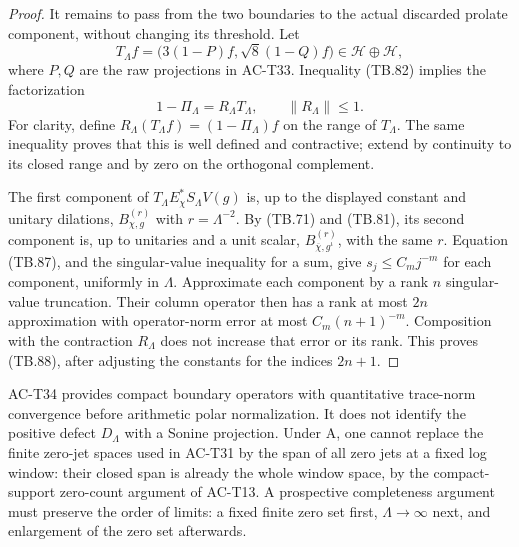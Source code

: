 \begin{proof}
It remains to pass from the two boundaries to the actual
discarded prolate component, without changing its threshold.
Let
\[
 T_\Lambda f=
        \bigl(3(1-P)f,\sqrt8(1-Q)f\bigr)
                      \in\mathcal H\oplus\mathcal H,
 \]
where \(P,Q\) are the raw projections in AC-T33.
Inequality (TB.82) implies the factorization
\[
               1-\Pi_\Lambda=R_\Lambda T_\Lambda,
                    \qquad \|R_\Lambda\|\leq1.
 \tag{TB.95}
\]
For clarity, define
\(R_\Lambda(T_\Lambda f)=(1-\Pi_\Lambda)f\) on the
range of \(T_\Lambda\).
The same inequality proves that this is well defined and
contractive; extend by continuity to its closed range and
by zero on the orthogonal complement.

The first component of
\(T_\Lambda E_\chi^*S_\Lambda V(g)\) is, up to the
displayed constant and unitary dilations, \(B_{\chi,g}^{(r)}\)
with \(r=\Lambda^{-2}\).
By (TB.71) and (TB.81), its second component is, up to
unitaries and a unit scalar,
\(B_{\overline\chi,g^\iota}^{(r)}\), with the same \(r\).
Equation (TB.87), and the singular-value inequality for a
sum, give \(s_j\leq C_mj^{-m}\) for each component,
uniformly in \(\Lambda\).
Approximate each component by a rank \(n\) singular-value
truncation.  Their column operator then has a rank at most
\(2n\) approximation with operator-norm error at most
\(C_m(n+1)^{-m}\).
Composition with the contraction \(R_\Lambda\) does not
increase that error or its rank.
This proves (TB.88), after adjusting the constants for
the indices \(2n+1\).
\end{proof}

\begin{remark}
AC-T34 provides compact boundary operators with quantitative
trace-norm convergence before arithmetic polar normalization.
It does not identify the positive defect \(D_\Lambda\)
with a Sonine projection.
Under A, one cannot replace the finite zero-jet spaces
used in AC-T31 by the span of all zero jets at a fixed log
window: their closed span is already the whole window
space, by the compact-support zero-count argument of
AC-T13.  A prospective completeness argument must preserve
the order of limits: a fixed finite zero set first,
\(\Lambda\to\infty\) next, and enlargement of the zero set
afterwards.
\end{remark}

